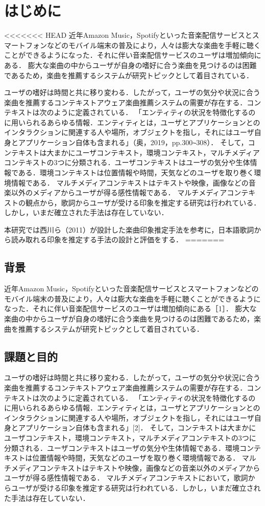\documentclass[a4paper,10pt,twocolumn]{jsarticle}
\begin{document}
\section{はじめに}
<<<<<<< HEAD
近年Amazon Music，Spotifyといった音楽配信サービスとスマートフォンなどのモバイル端末の普及により，人々は膨大な楽曲を手軽に聴くことができるようになった．それに伴い音楽配信サービスのユーザは増加傾向にある\cite{1}．
膨大な楽曲の中からユーザが自身の嗜好に合う楽曲を見つけるのは困難であるため，楽曲を推薦するシステムが研究トピックとして着目されている．

ユーザの嗜好は時間と共に移り変わる．したがって，ユーザの気分や状況に合う楽曲を推薦するコンテキストアウェア楽曲推薦システムの需要が存在する．コンテキストは次のように定義されている．
「エンティティの状況を特徴化するのに用いられるあらゆる情報．エンティティとは，ユーザとアプリケーションとのインタラクションに関連する人や場所，オブジェクトを指し，それにはユーザ自身とアプリケーション自体も含まれる」（奥，2019，pp.300\verb+~+308）．
そして，コンテキストは大まかにユーザコンテキスト，環境コンテキスト，マルチメディアコンテキストの3つに分類される．ユーザコンテキストはユーザの気分や生体情報である．環境コンテキストは位置情報や時間，天気などのユーザを取り巻く環境情報である．
マルチメディアコンテキストはテキストや映像，画像などの音楽以外のメディアからユーザが得る感性情報である．
マルチメディアコンテキストの観点から，歌詞からユーザが受ける印象を推定する研究は行われている．しかし，いまだ確立された手法は存在していない．

本研究では西川ら（2011）\cite{3}が設計した楽曲印象推定手法を参考に，日本語歌詞から読み取れる印象を推定する手法の設計と評価をする．
=======
\subsection{背景}
近年Amazon Music，Spotifyといった音楽配信サービスとスマートフォンなどのモバイル端末の普及により，人々は膨大な楽曲を手軽に聴くことができるようになった．それに伴い音楽配信サービスのユーザは増加傾向にある［1］．
膨大な楽曲の中からユーザが自身の嗜好に合う楽曲を見つけるのは困難であるため，楽曲を推薦するシステムが研究トピックとして着目されている．

\subsection{課題と目的}

ユーザの嗜好は時間と共に移り変わる．したがって，ユーザの気分や状況に合う楽曲を推薦するコンテキストアウェア楽曲推薦システムの需要が存在する．コンテキストは次のように定義されている．
「エンティティの状況を特徴化するのに用いられるあらゆる情報．エンティティとは，ユーザとアプリケーションとのインタラクションに関連する人や場所，オブジェクトを指し，それにはユーザ自身とアプリケーション自体も含まれる」[2]．
そして，コンテキストは大まかにユーザコンテキスト，環境コンテキスト，マルチメディアコンテキストの3つに分類される．ユーザコンテキストはユーザの気分や生体情報である．環境コンテキストは位置情報や時間，天気などのユーザを取り巻く環境情報である．
マルチメディアコンテキストはテキストや映像，画像などの音楽以外のメディアからユーザが得る感性情報である．
マルチメディアコンテキストにおいて，歌詞からユーザが受ける印象を推定する研究は行われている．しかし，いまだ確立された手法は存在していない．
\end{document}
